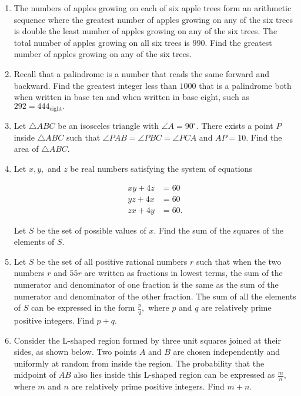 \documentclass{article}
\begin{document}
\begin{enumerate}[label=\arabic*., itemsep=0.5em]\item The numbers of apples growing on each of six apple trees form an arithmetic sequence where the greatest number of apples growing on any of the six trees is double the least number of apples growing on any of the six trees. The total number of apples growing on all six trees is \(990.\) Find the greatest number of apples growing on any of the six trees.\par \vspace{0.5em}\item Recall that a palindrome is a number that reads the same forward and backward. Find the greatest integer less than \(1000\) that is a palindrome both when written in base ten and when written in base eight, such as \(292 = 444_{\text{eight}}.\)\par \vspace{0.5em}\item Let \(\triangle ABC\) be an isosceles triangle with \(\angle A = 90^\circ.\) There exists a point \(P\) inside \(\triangle ABC\) such that \(\angle PAB = \angle PBC = \angle PCA\) and \(AP = 10.\) Find the area of \(\triangle ABC.\)\par \vspace{0.5em}\item Let \(x,y,\) and \(z\) be real numbers satisfying the system of equations

\begin{align*}
xy + 4z &= 60 \\
yz + 4x &= 60 \\
zx + 4y &= 60.
\end{align*}

Let \(S\) be the set of possible values of \(x.\) Find the sum of the squares of the elements of \(S.\)\par \vspace{0.5em}\item Let \(S\) be the set of all positive rational numbers \(r\) such that when the two numbers \(r\) and \(55r\) are written as fractions in lowest terms, the sum of the numerator and denominator of one fraction is the same as the sum of the numerator and denominator of the other fraction. The sum of all the elements of \(S\) can be expressed in the form \(\frac{p}{q},\) where \(p\) and \(q\) are relatively prime positive integers. Find \(p+q.\)\par \vspace{0.5em}\item Consider the L-shaped region formed by three unit squares joined at their sides, as shown below. Two points \(A\) and \(B\) are chosen independently and uniformly at random from inside the region. The probability that the midpoint of \(\overline{AB}\) also lies inside this L-shaped region can be expressed as \(\frac{m}{n},\) where \(m\) and \(n\) are relatively prime positive integers. Find \(m+n.\)


\end{enumerate}
\end{document}
